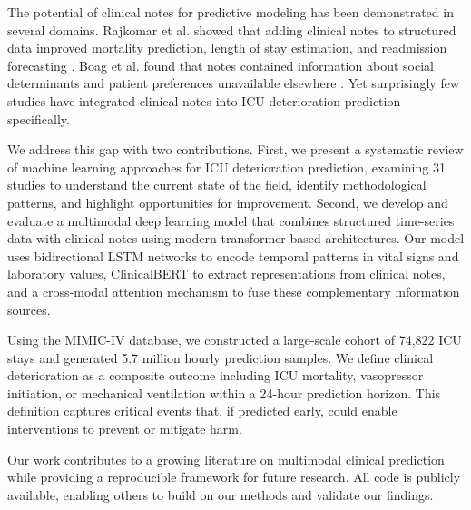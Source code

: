 The potential of clinical notes for predictive modeling has been demonstrated in several domains. Rajkomar et al. showed that adding clinical notes to structured data improved mortality prediction, length of stay estimation, and readmission forecasting \citep{Rajkomar2018}. Boag et al. found that notes contained information about social determinants and patient preferences unavailable elsewhere \citep{Boag2018}. Yet surprisingly few studies have integrated clinical notes into ICU deterioration prediction specifically.

We address this gap with two contributions. First, we present a systematic review of machine learning approaches for ICU deterioration prediction, examining 31 studies to understand the current state of the field, identify methodological patterns, and highlight opportunities for improvement. Second, we develop and evaluate a multimodal deep learning model that combines structured time-series data with clinical notes using modern transformer-based architectures. Our model uses bidirectional LSTM networks to encode temporal patterns in vital signs and laboratory values, ClinicalBERT to extract representations from clinical notes, and a cross-modal attention mechanism to fuse these complementary information sources.

Using the MIMIC-IV database, we constructed a large-scale cohort of 74,822 ICU stays and generated 5.7 million hourly prediction samples. We define clinical deterioration as a composite outcome including ICU mortality, vasopressor initiation, or mechanical ventilation within a 24-hour prediction horizon. This definition captures critical events that, if predicted early, could enable interventions to prevent or mitigate harm.

Our work contributes to a growing literature on multimodal clinical prediction while providing a reproducible framework for future research. All code is publicly available, enabling others to build on our methods and validate our findings.

